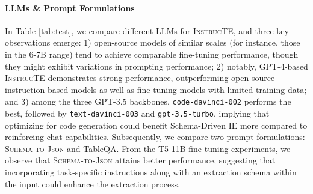 \documentclass[11pt]{article}
\newcommand\method{\textsc{InstrucTE}}
\newcommand\task{\textsc{Schema-to-Json}}
\begin{document}
\paragraph{LLMs \& Prompt Formulations} In Table \ref{tab:test}, we compare different LLMs for \textsc{InstrucTE}, and three key observations emerge: 1) open-source models of similar scales (for instance, those in the 6-7B range) tend to achieve comparable fine-tuning performance, though they might exhibit variations in prompting performance; 2) notably, GPT-4-based \method{} demonstrates strong performance, outperforming open-source instruction-based models as well as fine-tuning models with limited training data; and 3) among the three GPT-3.5 backbones, \texttt{code-davinci-002} performs the best, followed by \texttt{text-davinci-003} and \texttt{gpt-3.5-turbo}, implying that optimizing for code generation could benefit Schema-Driven IE more compared to reinforcing chat capabilities. Subsequently, we compare two prompt formulations: \task{} and TableQA. From the T5-11B fine-tuning experiments, we observe that \task{} attains better performance, suggesting that incorporating task-specific instructions along with an extraction schema within the input could enhance the extraction process.
\end{document}
